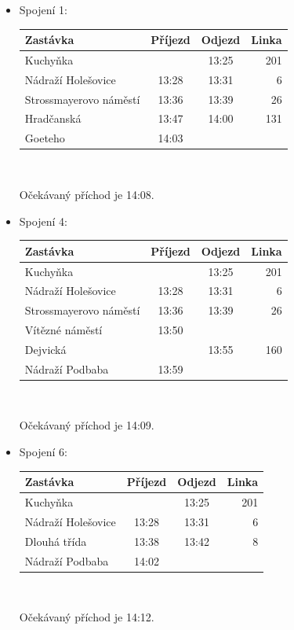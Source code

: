 \begin{itemize}
\item Spojení 1:\\
\vspace*{-0.5cm}
\begin{center}
\begin{tabular}{|l c c r|}\hline
{\bf Zastávka}&{\bf Příjezd}&{\bf Odjezd}&{\bf Linka}\\\hline
Kuchyňka&&13:25&201\\
Nádraží Holešovice&13:28&13:31&6\\
Strossmayerovo náměstí&13:36&13:39&26\\
Hradčanská&13:47&14:00&131\\
Goeteho&14:03&&\\\hline
\end{tabular}\\[2mm]
\end{center}
Očekávaný příchod je 14:08.

\item Spojení 4:\\
\vspace*{-0.5cm}
\begin{center}
\begin{tabular}{|l c c r|}\hline
{\bf Zastávka}&{\bf Příjezd}&{\bf Odjezd}&{\bf Linka}\\\hline
Kuchyňka&&13:25&201\\
Nádraží Holešovice&13:28&13:31&6\\
Strossmayerovo náměstí&13:36&13:39&26\\
Vítězné náměstí&13:50&&\\
Dejvická&&13:55&160\\
Nádraží Podbaba&13:59&&\\\hline
\end{tabular}\\[2mm]
\end{center}
Očekávaný příchod je 14:09. 

\item Spojení 6:\\
\vspace*{-0.5cm}
\begin{center}
\begin{tabular}{|l c c r|}\hline
{\bf Zastávka}&{\bf Příjezd}&{\bf Odjezd}&{\bf Linka}\\\hline
Kuchyňka&&13:25&201\\
Nádraží Holešovice&13:28&13:31&6\\
Dlouhá třída&13:38&13:42&8\\
Nádraží Podbaba&14:02&&\\\hline
\end{tabular}\\[2mm]
\end{center}
Očekávaný příchod je 14:12. 

\end{itemize}


